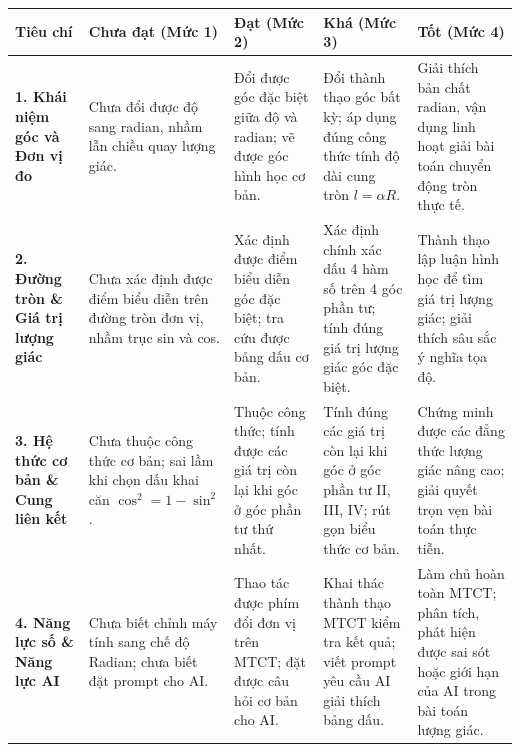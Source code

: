 \documentclass[12pt, a4paper]{article}
\begin{document}
\begin{table}[h!]
\centering
\small
\begin{tabularx}{\textwidth}{|p{2.8cm}|X|X|X|X|}
\hline
\textbf{Tiêu chí} & \textbf{Chưa đạt (Mức 1)} & \textbf{Đạt (Mức 2)} & \textbf{Khá (Mức 3)} & \textbf{Tốt (Mức 4)} \\
\hline
\textbf{1. Khái niệm góc và Đơn vị đo} & Chưa đổi được độ sang radian, nhầm lẫn chiều quay lượng giác. & Đổi được góc đặc biệt giữa độ và radian; vẽ được góc hình học cơ bản. & Đổi thành thạo góc bất kỳ; áp dụng đúng công thức tính độ dài cung tròn $l = \alpha R$. & Giải thích bản chất radian, vận dụng linh hoạt giải bài toán chuyển động tròn thực tế. \\
\hline
\textbf{2. Đường tròn \& Giá trị lượng giác} & Chưa xác định được điểm biểu diễn trên đường tròn đơn vị, nhầm trục sin và cos. & Xác định được điểm biểu diễn góc đặc biệt; tra cứu được bảng dấu cơ bản. & Xác định chính xác dấu 4 hàm số trên 4 góc phần tư; tính đúng giá trị lượng giác góc đặc biệt. & Thành thạo lập luận hình học để tìm giá trị lượng giác; giải thích sâu sắc ý nghĩa tọa độ. \\
\hline
\textbf{3. Hệ thức cơ bản \& Cung liên kết} & Chưa thuộc công thức cơ bản; sai lầm khi chọn dấu khai căn $\cos^2 = 1 - \sin^2$. & Thuộc công thức; tính được các giá trị còn lại khi góc ở góc phần tư thứ nhất. & Tính đúng các giá trị còn lại khi góc ở góc phần tư II, III, IV; rút gọn biểu thức cơ bản. & Chứng minh được các đẳng thức lượng giác nâng cao; giải quyết trọn vẹn bài toán thực tiễn. \\
\hline
\textbf{4. Năng lực số \& Năng lực AI} & Chưa biết chỉnh máy tính sang chế độ Radian; chưa biết đặt prompt cho AI. & Thao tác được phím đổi đơn vị trên MTCT; đặt được câu hỏi cơ bản cho AI. & Khai thác thành thạo MTCT kiểm tra kết quả; viết prompt yêu cầu AI giải thích bảng dấu. & Làm chủ hoàn toàn MTCT; phân tích, phát hiện được sai sót hoặc giới hạn của AI trong bài toán lượng giác. \\
\hline
\end{tabularx}
\end{table}
\end{document}
